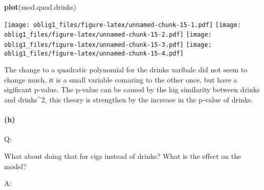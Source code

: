 \documentclass[
]{article}
\newenvironment{Shaded}{\begin{snugshade}}{\end{snugshade}}
\newcommand{\DataTypeTok}[1]{\textcolor[rgb]{0.13,0.29,0.53}{#1}}
\newcommand{\DecValTok}[1]{\textcolor[rgb]{0.00,0.00,0.81}{#1}}
\newcommand{\KeywordTok}[1]{\textcolor[rgb]{0.13,0.29,0.53}{\textbf{#1}}}
\newcommand{\NormalTok}[1]{#1}
\newcommand{\OperatorTok}[1]{\textcolor[rgb]{0.81,0.36,0.00}{\textbf{#1}}}
\newcommand{\StringTok}[1]{\textcolor[rgb]{0.31,0.60,0.02}{#1}}
\begin{document}
\begin{Shaded}
\begin{Highlighting}[]
\KeywordTok{plot}\NormalTok{(mod.quad.drinks)}
\end{Highlighting}
\end{Shaded}

\texttt{[image: oblig1\_files/figure-latex/unnamed-chunk-15-1.pdf]}
\texttt{[image: oblig1\_files/figure-latex/unnamed-chunk-15-2.pdf]}
\texttt{[image: oblig1\_files/figure-latex/unnamed-chunk-15-3.pdf]}
\texttt{[image: oblig1\_files/figure-latex/unnamed-chunk-15-4.pdf]}

The change to a quadratic polynomial for the drinks varibale did not
seem to change much, it is a small variable comaring to the other once,
but have a sigificant p-value. The p-value can be caused by the hig
similarity between drinks and drinks\^{}2, this theory is strengthen by
the increase in the p-value of drinks.

\hypertarget{h}{%
\paragraph{(h)}\label{h}}

Q:

What about doing that for cigs instead of drinks? What is the effect on
the model?

A:

\begin{Shaded}
\end{Shaded}
\end{document}
